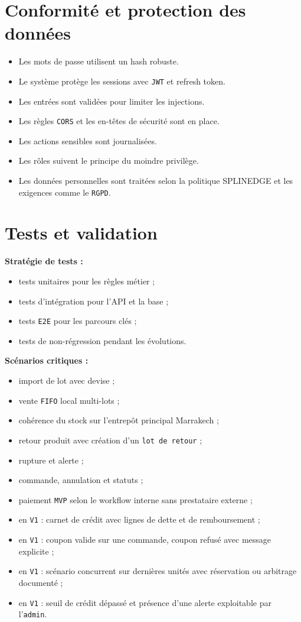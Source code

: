 \documentclass[11pt,a4paper]{scrreprt}
\newcommand{\code}[1]{\texttt{#1}}
\begin{document}
\section{Conformité et protection des données}
\begin{itemize}
  \item Les mots de passe utilisent un hash robuste.
  \item Le système protège les sessions avec \code{JWT} et refresh token.
  \item Les entrées sont validées pour limiter les injections.
  \item Les règles \code{CORS} et les en-têtes de sécurité sont en place.
  \item Les actions sensibles sont journalisées.
  \item Les rôles suivent le principe du moindre privilège.
  \item Les données personnelles sont traitées selon la politique SPLINEDGE et les exigences comme le \code{RGPD}.
\end{itemize}

\section{Tests et validation}
\textbf{Stratégie de tests :}
\begin{itemize}
  \item tests unitaires pour les règles métier ;
  \item tests d'intégration pour l'API et la base ;
  \item tests \code{E2E} pour les parcours clés ;
  \item tests de non-régression pendant les évolutions.
\end{itemize}

\textbf{Scénarios critiques :}
\begin{itemize}
  \item import de lot avec devise ;
  \item vente \code{FIFO} local multi-lots ;
  \item cohérence du stock sur l'entrepôt principal Marrakech ;
  \item retour produit avec création d'un \code{lot de retour} ;
  \item rupture et alerte ;
  \item commande, annulation et statuts ;
  \item paiement \code{MVP} selon le workflow interne sans prestataire externe ;
  \item en \code{V1} : carnet de crédit avec lignes de dette et de remboursement ;
  \item en \code{V1} : coupon valide sur une commande, coupon refusé avec message explicite ;
  \item en \code{V1} : scénario concurrent sur dernières unités avec réservation ou arbitrage documenté ;
  \item en \code{V1} : seuil de crédit dépassé et présence d'une alerte exploitable par l'\code{admin}.
\end{itemize}
\end{document}
